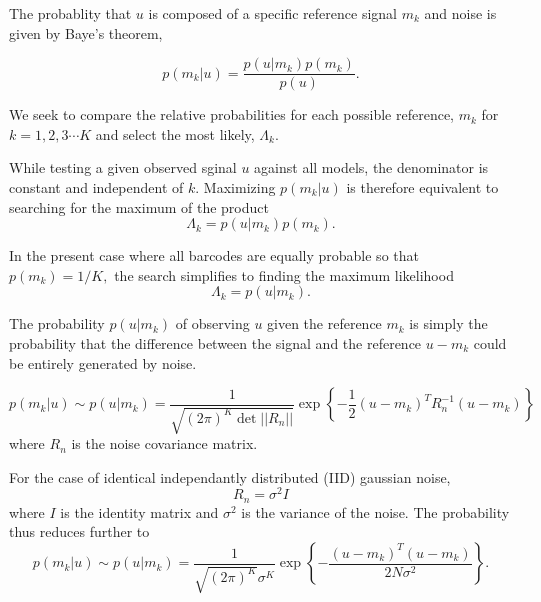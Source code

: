 The probablity that $u$ is composed of a specific reference signal $m_k$ and noise is given by Baye's theorem,

\begin{equation}\label{eq:Bayes}
p(m_k|u) = \frac{p(u|m_k)p(m_k)} {p(u)}.
\end{equation}

We seek to compare the relative probabilities for each possible reference, $m_k$ for $k=1,2,3 \cdots K$ and select the most likely, $\Lambda_k$. 

While testing a given observed sginal $u$ against all models, the denominator is constant and independent of $k$. Maximizing $p(m_k|u)$ is therefore equivalent to searching for the maximum of the product
\begin{equation}
\Lambda_k = p(u|m_k)p(m_k).
\end{equation}

In the present case where all barcodes are equally probable so that
$p(m_k)=1/K,$ 
the search simplifies to finding the maximum likelihood 
\begin{equation}
\Lambda_k = p(u|m_k).
\end{equation}

The probability $p(u|m_k)$ of observing $u$ given the reference $m_k$  is simply the probability that the difference between the signal and the reference $u-m_k$ could be entirely generated by noise.

\begin{equation}
p(m_k|u)\sim p(u|m_k) = \frac{1}{  \sqrt{ (2\pi)^K \det || R_n||} } \exp\left\{ -\frac{1}{2}  (u-m_k)^T R_n^{-1} (u-m_k) \right\}
\end{equation}
where $R_n$ is the noise covariance matrix. 

For the case of identical independantly distributed (IID) gaussian noise, 
\begin{equation}
R_n=\sigma^2 I
\end{equation}
where $I$ is the identity matrix and $\sigma^2$ is the variance of the noise. The probability thus reduces further to
\begin{equation}\label{eq:iidEnergy}
p(m_k|u)\sim p(u|m_k) = \frac{1}{  \sqrt{ (2\pi)^K} \sigma^K  } \exp\left\{ -\frac{(u-m_k)^T(u-m_k)} {2 N \sigma^2 } \right\}.
\end{equation}

